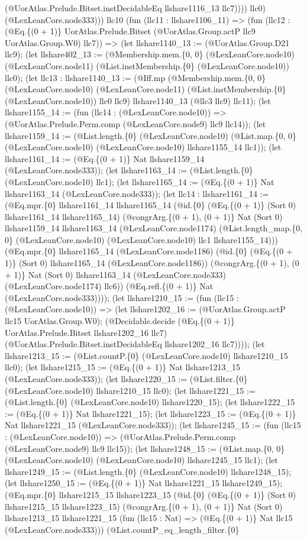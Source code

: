 \documentclass[11pt]{article}
\begin{document}
(@UorAtlas.Prelude.Bitset.instDecidableEq llshare1116\_13 llc7)))) llc0) (@LexLeanCore.node333))) llc10 (fun (llc11 : llshare1106\_11) => (fun (llc12 : (@Eq.\{(0 + 1)\} UorAtlas.Prelude.Bitset (@UorAtlas.Group.actP llc9 UorAtlas.Group.W0) llc7)) => (let llshare1140\_13 := (@UorAtlas.Group.D21 llc9); (let llshare402\_13 := (@Membership.mem.\{0, 0\} (@LexLeanCore.node10) (@LexLeanCore.node11) (@List.instMembership.\{0\} (@LexLeanCore.node10)) llc0); (let llc13 : llshare1140\_13 := (@Iff.mp (@Membership.mem.\{0, 0\} (@LexLeanCore.node10) (@LexLeanCore.node11) (@List.instMembership.\{0\} (@LexLeanCore.node10)) llc0 llc9) llshare1140\_13 (@llc3 llc9) llc11); (let llshare1155\_14 := (fun (llc14 : (@LexLeanCore.node10)) => (@UorAtlas.Prelude.Perm.comp (@LexLeanCore.node9) llc9 llc14)); (let llshare1159\_14 := (@List.length.\{0\} (@LexLeanCore.node10) (@List.map.\{0, 0\} (@LexLeanCore.node10) (@LexLeanCore.node10) llshare1155\_14 llc1)); (let llshare1161\_14 := (@Eq.\{(0 + 1)\} Nat llshare1159\_14 (@LexLeanCore.node333)); (let llshare1163\_14 := (@List.length.\{0\} (@LexLeanCore.node10) llc1); (let llshare1165\_14 := (@Eq.\{(0 + 1)\} Nat llshare1163\_14 (@LexLeanCore.node333)); (let llc14 : llshare1161\_14 := (@Eq.mpr.\{0\} llshare1161\_14 llshare1165\_14 (@id.\{0\} (@Eq.\{(0 + 1)\} (Sort 0) llshare1161\_14 llshare1165\_14) (@congrArg.\{(0 + 1), (0 + 1)\} Nat (Sort 0) llshare1159\_14 llshare1163\_14 (@LexLeanCore.node1174) (@List.length\_map.\{0, 0\} (@LexLeanCore.node10) (@LexLeanCore.node10) llc1 llshare1155\_14))) (@Eq.mpr.\{0\} llshare1165\_14 (@LexLeanCore.node1186) (@id.\{0\} (@Eq.\{(0 + 1)\} (Sort 0) llshare1165\_14 (@LexLeanCore.node1186)) (@congrArg.\{(0 + 1), (0 + 1)\} Nat (Sort 0) llshare1163\_14 (@LexLeanCore.node333) (@LexLeanCore.node1174) llc6)) (@Eq.refl.\{(0 + 1)\} Nat (@LexLeanCore.node333)))); (let llshare1210\_15 := (fun (llc15 : (@LexLeanCore.node10)) => (let llshare1202\_16 := (@UorAtlas.Group.actP llc15 UorAtlas.Group.W0); (@Decidable.decide (@Eq.\{(0 + 1)\} UorAtlas.Prelude.Bitset llshare1202\_16 llc7) (@UorAtlas.Prelude.Bitset.instDecidableEq llshare1202\_16 llc7)))); (let llshare1213\_15 := (@List.countP.\{0\} (@LexLeanCore.node10) llshare1210\_15 llc0); (let llshare1215\_15 := (@Eq.\{(0 + 1)\} Nat llshare1213\_15 (@LexLeanCore.node333)); (let llshare1220\_15 := (@List.filter.\{0\} (@LexLeanCore.node10) llshare1210\_15 llc0); (let llshare1221\_15 := (@List.length.\{0\} (@LexLeanCore.node10) llshare1220\_15); (let llshare1222\_15 := (@Eq.\{(0 + 1)\} Nat llshare1221\_15); (let llshare1223\_15 := (@Eq.\{(0 + 1)\} Nat llshare1221\_15 (@LexLeanCore.node333)); (let llshare1245\_15 := (fun (llc15 : (@LexLeanCore.node10)) => (@UorAtlas.Prelude.Perm.comp (@LexLeanCore.node9) llc9 llc15)); (let llshare1248\_15 := (@List.map.\{0, 0\} (@LexLeanCore.node10) (@LexLeanCore.node10) llshare1245\_15 llc1); (let llshare1249\_15 := (@List.length.\{0\} (@LexLeanCore.node10) llshare1248\_15); (let llshare1250\_15 := (@Eq.\{(0 + 1)\} Nat llshare1221\_15 llshare1249\_15); (@Eq.mpr.\{0\} llshare1215\_15 llshare1223\_15 (@id.\{0\} (@Eq.\{(0 + 1)\} (Sort 0) llshare1215\_15 llshare1223\_15) (@congrArg.\{(0 + 1), (0 + 1)\} Nat (Sort 0) llshare1213\_15 llshare1221\_15 (fun (llc15 : Nat) => (@Eq.\{(0 + 1)\} Nat llc15 (@LexLeanCore.node333))) (@List.countP\_eq\_length\_filter.\{0\} 
\end{document}
